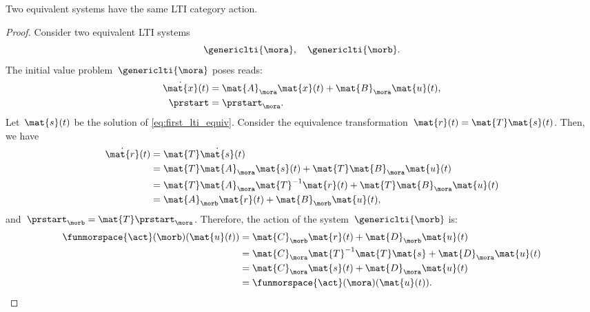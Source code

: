 \begin{lemma}
    \label{lem:equivsystequivact}
    Two equivalent systems have the same LTI category action.
\end{lemma}
\begin{proof}
    Consider two equivalent LTI systems
    \begin{equation}
        \genericlti{\mora},\quad \genericlti{\morb}.
    \end{equation}
    The initial value problem~$\genericlti{\mora}$ poses reads:
    \begin{equation}
        \label{eq:first_lti_equiv}
        \begin{aligned}
            \dot{\mat{x}}(t) & =\mat{A}_{\mora}\mat{x}(t)+\mat{B}_{\mora}\mat{u}(t), \\
            \prstart         & = \prstart_\mora.
        \end{aligned}
    \end{equation}
    Let~$\mat{s}(t)$ be the solution of \cref{eq:first_lti_equiv}.
    Consider the equivalence transformation~$\mat{r}(t)\linebreak[0]=\mat{T}\mat{s}(t)$.
    Then, we have
    \begin{equation}
        \begin{aligned}
            \dot{\mat{r}}(t) & =\mat{T}\dot{\mat{s}}(t) \\
                             & =\mat{T}\mat{A}_\mora \mat{s}(t)+\mat{T}\mat{B}_\mora \mat{u}(t) \\
                             & =\mat{T}\mat{A}_\mora \mat{T}^{-1}\mat{r}(t)+\mat{T}\mat{B}_\mora \mat{u}(t) \\
                             & =\mat{A}_\morb\mat{r}(t)+\mat{B}_\morb \mat{u}(t),
        \end{aligned}
    \end{equation}
    and~$ \prstart_\morb=\mat{T} \prstart_\mora$.
    Therefore, the action of the system~$\genericlti{\morb}$ is:
    \begin{equation}
        \begin{aligned}
            \funmorspace{\act}(\morb)(\mat{u}(t)) & =\mat{C}_\morb \mat{r}(t)+ \mat{D}_\morb \mat{u}(t) \\
                                                  & =\mat{C}_\mora \mat{T}^{-1}\mat{T}\mat{s}+\mat{D}_\mora \mat{u}(t) \\
                                                  & =\mat{C}_\mora \mat{s}(t)+\mat{D}_\mora \mat{u}(t) \\
                                                  & =\funmorspace{\act}(\mora)(\mat{u}(t)).
        \end{aligned}
    \end{equation}
\end{proof}

